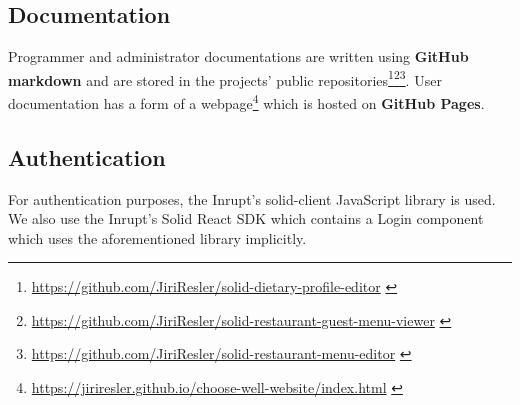 \subsection*{Documentation}
Programmer and administrator documentations are written using \textbf{GitHub markdown} and are stored in the projects' public repositories\footnote{\url{https://github.com/JiriResler/solid-dietary-profile-editor}  \label{fnlabel}}\footnote{\url{https://github.com/JiriResler/solid-restaurant-guest-menu-viewer}  \label{fnlabel}}\footnote{\url{https://github.com/JiriResler/solid-restaurant-menu-editor}  \label{fnlabel}}.
User documentation has a form of a webpage\footnote{\url{https://jiriresler.github.io/choose-well-website/index.html}  \label{fnlabel}} which is hosted on \textbf{GitHub Pages}.

\subsection*{Authentication}
For authentication purposes, the Inrupt's solid-client JavaScript library is used.
We also use the Inrupt's Solid React SDK which contains a Login component which uses the aforementioned library implicitly.
